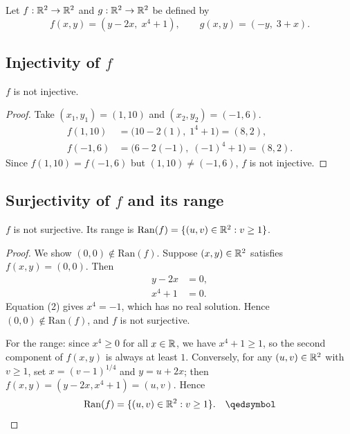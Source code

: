 Let $f : \mathbb{R}^{2} \to \mathbb{R}^{2}$ and $g : \mathbb{R}^{2} \to \mathbb{R}^{2}$ be defined by
\[
    f(x, y) = (y - 2x,\; x^4 + 1),
    \qquad
    g(x, y) = (-y,\; 3 + x).
\]

\subsection{Injectivity of \texorpdfstring{$f$}{f}}

\begin{proposition}
$f$ is not injective.
\end{proposition}

\begin{proof}
Take $(x_1, y_1) = (1, 10)$ and $(x_2, y_2) = (-1, 6)$.
\begin{align*}
    f(1, 10) &= \bigl(10 - 2(1),\; 1^4 + 1\bigr) = (8, 2), \\
    f(-1, 6) &= \bigl(6 - 2(-1),\; (-1)^4 + 1\bigr) = (8, 2).
\end{align*}
Since $f(1,10) = f(-1,6)$ but $(1,10) \neq (-1,6)$, $f$ is not injective.
\end{proof}

\subsection{Surjectivity of \texorpdfstring{$f$}{f} and its range}

\begin{proposition}
$f$ is not surjective. Its range is
$\mathrm{Ran}(f) = \{(u, v) \in \mathbb{R}^{2} : v \geq 1\}$.
\end{proposition}

\begin{proof}
We show $(0, 0) \notin \mathrm{Ran}(f)$. Suppose $(x, y) \in \mathbb{R}^{2}$ satisfies
$f(x,y) = (0,0)$. Then
\begin{align}
    y - 2x &= 0, \tag{1}\\
    x^4 + 1 &= 0. \tag{2}
\end{align}
Equation (2) gives $x^4 = -1$, which has no real solution. Hence $(0,0) \notin
\mathrm{Ran}(f)$, and $f$ is not surjective.

For the range: since $x^4 \geq 0$ for all $x \in \mathbb{R}$, we have $x^4 + 1 \geq 1$,
so the second component of $f(x,y)$ is always at least $1$. Conversely, for any
$(u, v) \in \mathbb{R}^{2}$ with $v \geq 1$, set $x = (v-1)^{1/4}$ and $y = u + 2x$;
then $f(x,y) = (y - 2x, x^4 + 1) = (u, v)$. Hence
\[
    \mathrm{Ran}(f) = \{(u, v) \in \Rtwo : v \geq 1\}. \qedhere
\]
\end{proof}

